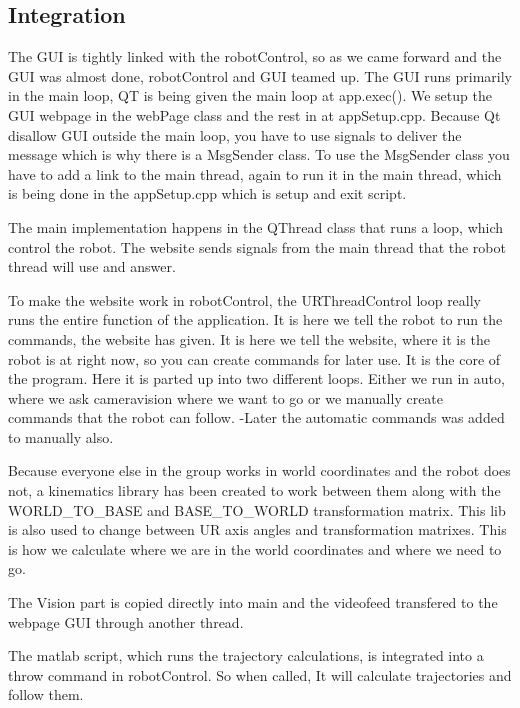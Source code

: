 \label{sec:Implementation}

\subsection{Integration}
The GUI is tightly linked with the robotControl, so as we came forward and the GUI was almost done, robotControl and GUI teamed up.
The GUI runs primarily in the main loop, QT is being given the main loop at app.exec(). 
We setup the GUI webpage in the webPage class and the rest in at appSetup.cpp.
Because Qt disallow GUI outside the main loop, you have to use signals to deliver the message which is why there is a MsgSender class.
To use the MsgSender class you have to add a link to the main thread, again to run it in the main thread, which is being done in the appSetup.cpp which is setup and exit script.

The main implementation happens in the QThread class that runs a loop, which control the robot. The website sends signals from the main thread that the robot thread will use and answer.

To make the website work in robotControl, the URThreadControl loop really runs the entire function of the application. 
It is here we tell the robot to run the commands, the website has given. It is here we tell the website, where it is the robot is at right now, so you can create commands for later use.
It is the core of the program. Here it is parted up into two different loops. Either we run in auto, where we ask cameravision where we want to go or we manually create commands that the robot can follow. 
-Later the automatic commands was added to manually also.

Because everyone else in the group works in world coordinates and the robot does not, a kinematics library has been created to work between them along with the WORLD\_TO\_BASE and BASE\_TO\_WORLD transformation matrix. 
This lib is also used to change between UR axis angles and transformation matrixes. This is how we calculate where we are in the world coordinates and where we need to go.

The Vision part is copied directly into main and the videofeed transfered to the webpage GUI through another thread.

The matlab script, which runs the trajectory calculations, is integrated into a throw command in robotControl. \- So when called, It will calculate trajectories and follow them.

